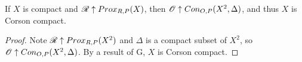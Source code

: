 \begin{corollary}
If $X$ is compact and $\mathscr{R}\uparrow Prox_{R,P}(X)$, then $\mathscr{O}\uparrow Con_{O,P}(X^2,\Delta)$, and thus $X$ is Corson compact.
\end{corollary}

\begin{proof}
Note $\mathscr{R}\uparrow Prox_{R,P}(X^2)$ and $\Delta$ is a compact subset of $X^2$, so $\mathscr{O}\uparrow Con_{O,P}(X^2,\Delta)$. By a result of G, $X$ is Corson compact.
\end{proof}











